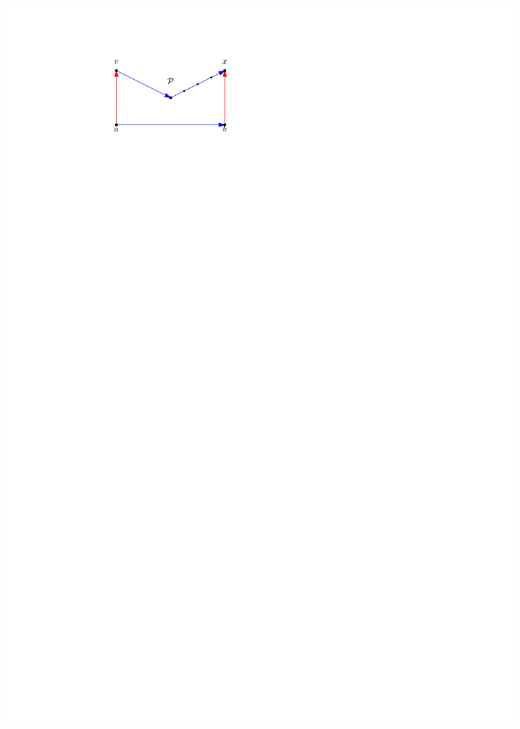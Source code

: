 \documentclass[a4paper]{article}
\begin{document}
\includegraphics[scale=1]{./unifiedAlgo/img/sweep/bottompathChord.pdf}
\clearpage%
\end{document}
